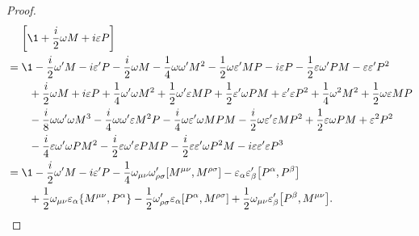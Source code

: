 \begin{proof}
\begin{align*}
        &\quad\, \left[ \1 + \frac{i}{2} \omega M + i \epsilon P  \right] \\
        &= \1 - \frac{i}{2} \omega' M - i \epsilon' P - \frac{i}{2} \omega M - \frac{1}{4} \omega \omega' M^2 - \frac{1}{2} \omega \epsilon' M P - i \epsilon P - \frac{1}{2} \epsilon \omega' P M - \epsilon \epsilon' P^2 \\
        &\quad\quad +\frac{i}{2}\omega M + i \epsilon P +\frac{1}{4} \omega' \omega M^2 + \frac{1}{2} \omega' \epsilon M P +\frac{1}{2} \epsilon' \omega P M + \epsilon' \epsilon P^2 +\frac{1}{4} \omega^2 M^2 + \frac{1}{2} \omega \epsilon M P \\
        &\quad\quad -\frac{i}{8} \omega \omega' \omega M^3 - \frac{i}{4} \omega \omega' \epsilon M^2 P -\frac{i}{4} \omega \epsilon' \omega M P M - \frac{i}{2} \omega \epsilon' \epsilon M P^2 +\frac{1}{2} \epsilon \omega P M + \epsilon^2 P^2 \\
        &\quad\quad -\frac{i}{4} \epsilon \omega' \omega P M^2 - \frac{i}{2} \epsilon \omega' \epsilon P M P -\frac{i}{2} \epsilon \epsilon' \omega P^2 M - i \epsilon \epsilon' \epsilon P^3 \\
        &= \1 -\frac{i}{2} \omega' M - i \epsilon' P - \frac{1}{4} \omega_{\mu\nu} \omega'_{\rho\sigma} \comm{M^{\mu\nu}}{M^{\rho\sigma}} - \epsilon_\alpha \epsilon'_\beta \comm{P^\alpha}{P^\beta} \\
        &\quad\quad +\frac{1}{2} \omega_{\mu\nu} \epsilon_\alpha \{ M^{\mu\nu}, P^\alpha \} - \frac{1}{2} \omega'_{\rho\sigma} \epsilon_\alpha \comm{P^\alpha}{M^{\rho\sigma}} + \frac{1}{2} \omega_{\mu\nu} \epsilon'_\beta \comm{P^\beta}{M^{\mu\nu}}.
    \end{align*}


\end{proof}
